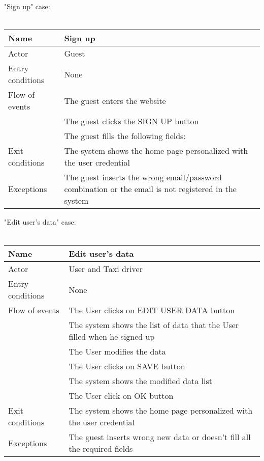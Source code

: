 \newpage
"Sign up" case:
\\
\\
\begin{tabular}{|l|p{10cm}|} 
\hline
Name & Sign up\\
\hline
Actor & Guest\\
\hline
Entry conditions & None\\
\hline
Flow of events
			&	\tabitem The guest enters the website\\
			&	\tabitem The guest clicks the SIGN UP button\\
			&	\tabitem The guest fills the following fields:\\
\hline
Exit conditions & The system shows the home page personalized with the user credential\\
\hline
Exceptions & The guest inserts the wrong email/password combination or the email is not registered in the system\\
\hline
\end {tabular}


\newpage
"Edit user's data" case:
\\
\\
\begin{tabular}{|l|p{10cm}|} 
\hline
Name & Edit user's data\\
\hline
Actor & User and Taxi driver\\
\hline
Entry conditions & None\\
\hline
Flow of events
			&	\tabitem The User clicks on EDIT USER DATA button\\
			&	\tabitem The system shows the list of data that the User filled when he signed up\\
			&	\tabitem The User modifies the data\\
			&	\tabitem The User clicks on SAVE button\\
			&	\tabitem The system shows the modified data list\\
			&	\tabitem The User click on OK button\\
\hline
Exit conditions & The system shows the home page personalized with the user credential\\
\hline
Exceptions & The guest inserts wrong new data or doesn't fill all the required fields\\
\hline
\end {tabular}


